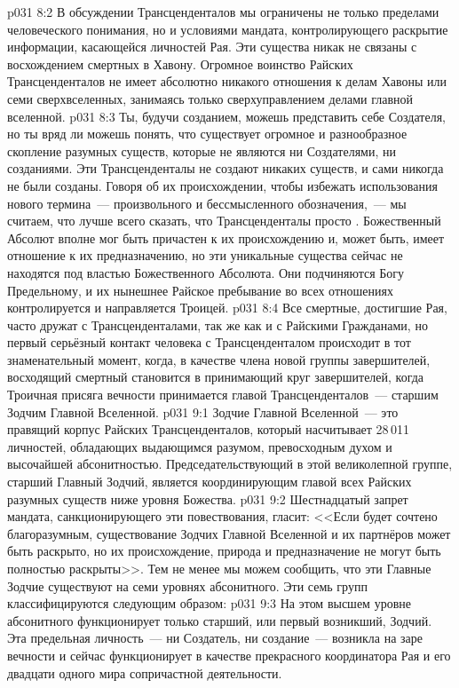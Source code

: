 \vs p031 8:2 В обсуждении Трансценденталов мы ограничены не только пределами человеческого понимания, но и условиями мандата, контролирующего раскрытие информации, касающейся личностей Рая. Эти существа никак не связаны с восхождением смертных в Хавону. Огромное воинство Райских Трансценденталов не имеет абсолютно никакого отношения к делам Хавоны или семи сверхвселенных, занимаясь только сверхуправлением делами главной вселенной.
\vs p031 8:3 Ты, будучи созданием, можешь представить себе Создателя, но ты вряд ли можешь понять, что существует огромное и разнообразное скопление разумных существ, которые не являются ни Создателями, ни созданиями. Эти Трансценденталы не создают никаких существ, и сами никогда не были созданы. Говоря об их происхождении, чтобы избежать использования нового термина~--- произвольного и бессмысленного обозначения,~--- мы считаем, что лучше всего сказать, что Трансценденталы просто . Божественный Абсолют вполне мог быть причастен к их происхождению и, может быть, имеет отношение к их предназначению, но эти уникальные существа сейчас не находятся под властью Божественного Абсолюта. Они подчиняются Богу Предельному, и их нынешнее Райское пребывание во всех отношениях контролируется и направляется Троицей.
\vs p031 8:4 Все смертные, достигшие Рая, часто дружат с Трансценденталами, так же как и с Райскими Гражданами, но первый серьёзный контакт человека с Трансценденталом происходит в тот знаменательный момент, когда, в качестве члена новой группы завершителей, восходящий смертный становится в принимающий круг завершителей, когда Троичная присяга вечности принимается главой Трансценденталов~--- старшим Зодчим Главной Вселенной.
\vs p031 9:1 Зодчие Главной Вселенной~--- это правящий корпус Райских Трансценденталов, который насчитывает 28\,011 личностей, обладающих выдающимся разумом, превосходным духом и высочайшей абсонитностью. Председательствующий в этой великолепной группе, старший Главный Зодчий, является координирующим главой всех Райских разумных существ ниже уровня Божества.
\vs p031 9:2 Шестнадцатый запрет мандата, санкционирующего эти повествования, гласит: <<Если будет сочтено благоразумным, существование Зодчих Главной Вселенной и их партнёров может быть раскрыто, но их происхождение, природа и предназначение не могут быть полностью раскрыты>>. Тем не менее мы можем сообщить, что эти Главные Зодчие существуют на семи уровнях абсонитного. Эти семь групп классифицируются следующим образом:
\vs p031 9:3  На этом высшем уровне абсонитного функционирует только старший, или первый возникший, Зодчий. Эта предельная личность~--- ни Создатель, ни создание~--- возникла на заре вечности и сейчас функционирует в качестве прекрасного координатора Рая и его двадцати одного мира сопричастной деятельности.
